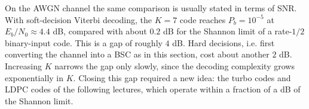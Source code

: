 On the AWGN channel the same comparison is usually stated in terms of SNR. With soft-decision Viterbi decoding, the \(K=7\) code reaches \(P_b = 10^{-5}\) at \(E_b/N_0 \approx 4.4\) dB, compared with about \(0.2\) dB for the Shannon limit of a rate-\(1/2\) binary-input code. This is a gap of roughly \(4\) dB. Hard decisions, i.e. first converting the channel into a BSC as in this section, cost about another \(2\) dB. Increasing \(K\) narrows the gap only slowly, since the decoding complexity grows exponentially in \(K\). Closing this gap required a new idea: the turbo codes and LDPC codes of the following lectures, which operate within a fraction of a dB of the Shannon limit.

